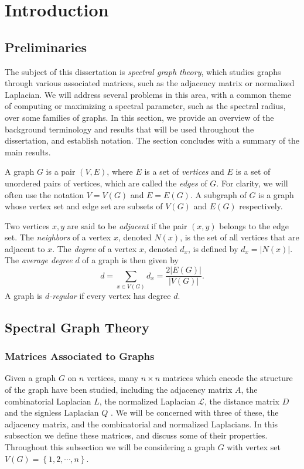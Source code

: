 \chapter{Introduction}

\section{Preliminaries}

The subject of this dissertation is \textit{spectral graph theory}, which studies graphs through
various associated matrices, such as the adjacency matrix or normalized Laplacian.
We will address several problems in this area, with a common theme
of computing or maximizing a spectral parameter, such as the spectral radius, over some families of graphs.  
In this section, we provide an overview of the background terminology and results that will be used throughout the
dissertation, and establish notation.  The section concludes with a summary of the main results.


A graph $G$ is a pair $(V,E)$, where $E$ is a set of \textit{vertices} and $E$ is a set of unordered
pairs of vertices, which are called the \textit{edges} of $G$.  For clarity, we will often
use the notation $V = V(G)$ and $E = E(G)$.  A subgraph of $G$ is a graph whose vertex set and
edge set are subsets of $V(G)$ and $E(G)$ respectively.


Two vertices $x,y$ are said to be \textit{adjacent}
if the pair $(x,y)$ belongs to the edge set.  The \textit{neighbors} of a vertex $x$, denoted $N(x)$,
is the set of all vertices that are adjacent to $x$.  The \textit{degree} of a vertex $x$, denoted $d_x$,
is defined by $d_x = |N(x)|$.  The \textit{average degree} $d$ of a graph is then given by
\[ d = \sum_{x \in V(G)} d_x = \frac{2 |E(G)|}{|V(G)|}. \]
A graph is \textit{$d$-regular} if every vertex has degree $d$.



\section{Spectral Graph Theory}

\subsection{Matrices Associated to Graphs}


Given a graph $G$ on $n$ vertices, many $n \times n$ matrices which encode the structure
of the graph have been studied, including the adjacency matrix $A$, the combinatorial Laplacian $L$,
the normalized Laplacian $\mathcal{L}$, the distance matrix $D$ \cite{GrahamPollak1971}
and the signless Laplacian $Q$ \cite{CvetkovicEtAl2007}.
We will be concerned with three of these, the adjacency matrix, and the combinatorial and normalized
Laplacians.  In this subsection we define these matrices, and discuss some of their properties.
Throughout this subsection we will be considering a graph $G$ with vertex set
$V(G) = \left\{ 1,2, \cdots, n\right\}$.


